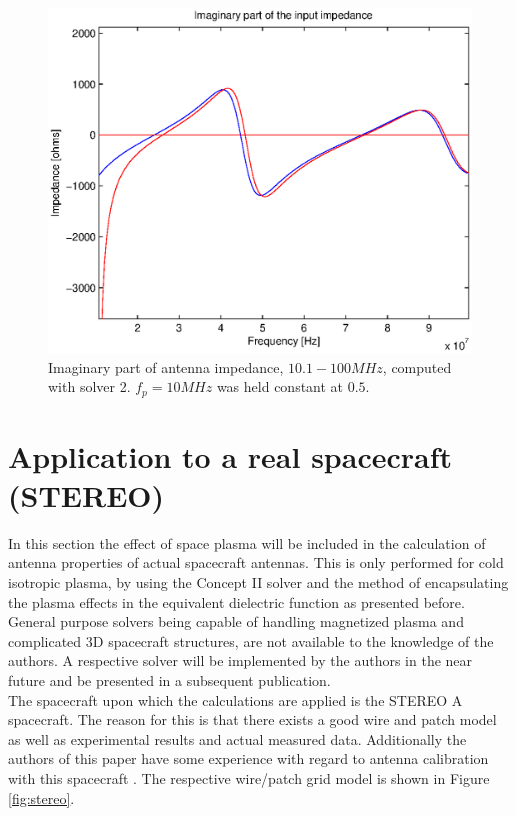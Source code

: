 \documentclass[a4paper,11pt]{article}
\begin{document}
\begin{figure}
\includegraphics[width=12cm]{imps_dipole_solver2_imag2.eps}
\caption{Imaginary part of antenna impedance, $10.1 - 100 MHz$, computed with solver 2. $f_p=10MHz$ was held constant at $0.5$.}
\label{fig:impedances_dipole_solver2_imag2}
\end{figure}

\section{Application to a real spacecraft (STEREO)}
In this section the effect of space plasma will be included in the calculation of antenna properties of actual spacecraft antennas. This is only performed for cold isotropic plasma, by using the Concept II solver and the method of encapsulating the plasma effects in the equivalent dielectric function as presented before. General purpose solvers being capable of handling magnetized plasma and complicated 3D spacecraft structures, are not available to the knowledge of the authors. A respective solver will be implemented by the authors in the near future and be presented in a subsequent publication. \\

The spacecraft upon which the calculations are applied is the STEREO A spacecraft. The reason for this is that there exists a good wire and patch model as well as experimental results and actual measured data. Additionally the authors of this paper have some experience with regard to antenna calibration with this spacecraft \cite{ossi09}. The respective wire/patch grid model is shown in Figure \ref{fig:stereo}.\\
\end{document}
